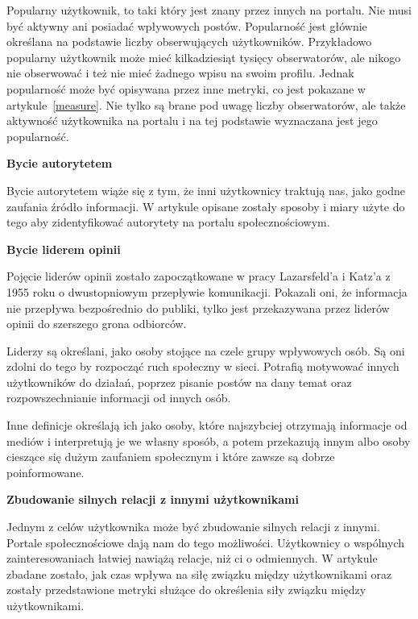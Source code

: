 \documentclass[polish,12pt]{aghthesis}
\begin{document}
Popularny użytkownik, to taki który jest znany przez innych na portalu. Nie musi być aktywny ani posiadać wpływowych postów. Popularność jest głównie określana na podstawie liczby obserwujących użytkowników. Przykładowo popularny użytkownik może mieć kilkadziesiąt tysięcy obserwatorów, ale nikogo nie obserwować i też nie mieć żadnego wpisu na swoim profilu. Jednak popularność może być opisywana przez inne metryki, co jest pokazane w artykule~\ref{measure}. Nie tylko są brane pod uwagę liczby obserwatorów, ale także aktywność użytkownika na portalu i na tej podstawie wyznaczana jest jego popularność.

\vspace{5mm}

\noindent
\textbf{Bycie autorytetem}

Bycie autorytetem wiąże się z tym, że inni użytkownicy traktują nas, jako godne zaufania źródło informacji. W artykule\cite{authority} opisane zostały sposoby i miary użyte do tego aby zidentyfikować autorytety na portalu społecznościowym.

\vspace{5mm}

\noindent
\textbf{Bycie liderem opinii}

Pojęcie liderów opinii zostało zapoczątkowane w pracy Lazarsfeld'a i Katz'a\cite{kazt} z 1955 roku o dwustopniowym przepływie komunikacji. Pokazali oni, że informacja nie przepływa bezpośrednio do publiki, tylko jest przekazywana przez liderów opinii do szerszego grona odbiorców.  

Liderzy są określani, jako osoby stojące na czele grupy wpływowych osób. Są oni zdolni do tego by rozpocząć ruch społeczny w sieci. Potrafią motywować innych użytkowników do działań, poprzez pisanie postów na dany temat oraz rozpowszechnianie informacji od innych osób. 

Inne definicje\cite{opinionLeaders} określają ich jako osoby, które najszybciej otrzymają informacje od mediów i interpretują je we własny sposób, a potem przekazują innym albo osoby cieszące się dużym zaufaniem społecznym i które zawsze są dobrze poinformowane.

\vspace{5mm}

\noindent
\textbf{Zbudowanie silnych relacji z innymi użytkownikami}

Jednym z celów użytkownika może być zbudowanie silnych relacji z innymi. Portale społecznościowe dają nam do tego możliwości. Użytkownicy o wspólnych zainteresowaniach łatwiej nawiążą relacje, niż ci o odmiennych. W artykule\cite{relationshipstrength} zbadane zostało, jak czas wpływa na siłę związku między użytkownikami oraz zostały przedstawione metryki służące do określenia siły związku między użytkownikami.
\end{document}
